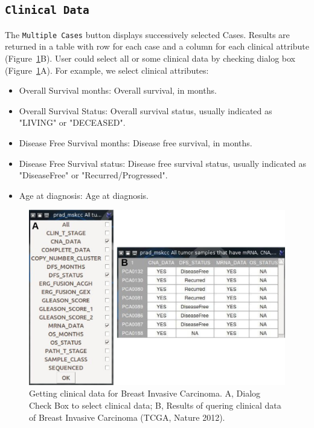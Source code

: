\documentclass[a4paper]{article}
\begin{document}
\subsection{\texttt{Clinical Data}}
The \texttt{Multiple Cases} button displays successively selected Cases. Results are returned in a table with row for each case and a column for each clinical attribute (Figure~\ref{Fig4}B). User could select all  or some clinical data by checking dialog box (Figure~\ref{Fig4}A). For example, we select clinical attributes:

\begin{itemize}
 \item Overall Survival months: Overall survival, in months.
\item Overall Survival Status: Overall survival status, usually indicated as "LIVING" or "DECEASED".
\item Disease Free Survival months: Disease free survival, in months.
\item Disease Free Survival status: Disease free survival status, usually indicated as "DiseaseFree" or "Recurred/Progressed".
\item Age at diagnosis: Age at diagnosis.

\end{itemize}


\begin{figure}[!ht]
 \centering
\includegraphics[scale=1]{image/clinicalData.png}
\caption{Getting clinical data for Breast Invasive Carcinoma. A, Dialog Check Box to select clinical data; B, Results of quering clinical data of Breast Invasive Carcinoma (TCGA, Nature 2012).   }
\label{Fig4}
\end{figure}
\end{document}
